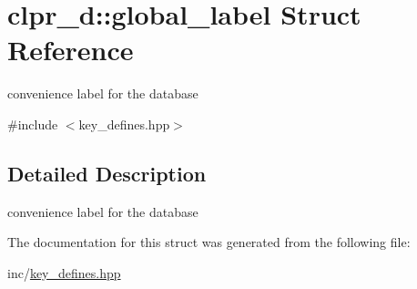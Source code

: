 \hypertarget{structclpr__d_1_1global__label}{\section{clpr\-\_\-d\-:\-:global\-\_\-label \-Struct \-Reference}
\label{structclpr__d_1_1global__label}
}


convenience label for the database  




{\ttfamily \#include $<$key\-\_\-defines.\-hpp$>$}



\subsection{\-Detailed \-Description}
convenience label for the database 

\-The documentation for this struct was generated from the following file\-:\begin{DoxyCompactItemize}
\item 
inc/\hyperlink{key__defines_8hpp}{key\-\_\-defines.\-hpp}\end{DoxyCompactItemize}
